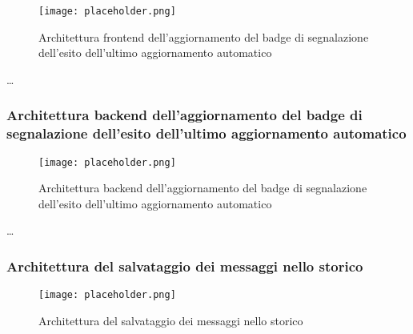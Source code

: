 \begin{figure}[h]
    \centering
    \texttt{[image: placeholder.png]}
    \caption{Architettura frontend dell’aggiornamento del badge di segnalazione dell’esito dell’ultimo aggiornamento automatico}
\end{figure}

\dots

\newpage


\subsubsection{Architettura backend dell’aggiornamento del badge di segnalazione dell’esito dell’ultimo aggiornamento automatico}
\label{sec:architettura_backend_badge_aggiornamento}

\begin{figure}[h]
    \centering
    \texttt{[image: placeholder.png]}
    \caption{Architettura backend dell’aggiornamento del badge di segnalazione dell’esito dell’ultimo aggiornamento automatico}
\end{figure}

\dots

\newpage


\subsubsection{Architettura del salvataggio dei messaggi nello storico}
\label{sec:architettura_salvataggio_messaggi_storico}

\begin{figure}[h]
    \centering
    \texttt{[image: placeholder.png]}
    \caption{Architettura del salvataggio dei messaggi nello storico}
\end{figure}

